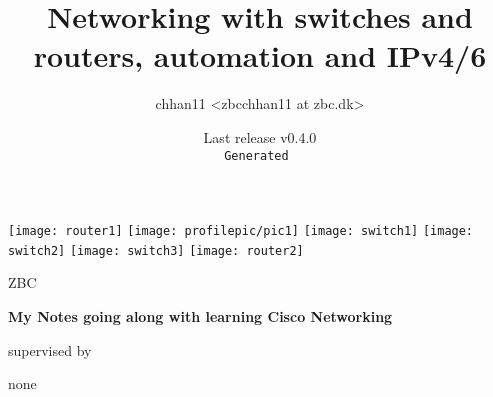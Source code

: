 
\title{Networking with switches and routers, automation and IPv4/6}
\def\thesubject{My Notes going along with learning Cisco Networking}
\def\theinstitution{ZBC}

\author{chhan11 <zbcchhan11 at zbc.dk>}
\def\thesupervisor{none}

\def\theversion{v0.4.0}
\date{{\footnotesize Last release \theversion\\%
    \texttt{\color{Gray}Generated \utccurrenttime}}}

\begin{titlepage}
    \centering
    \texttt{[image: router1]}
    \texttt{[image: profilepic/pic1]}
    \texttt{[image: switch1]}
    \texttt{[image: switch2]}
    \texttt{[image: switch3]}
    \texttt{[image: router2]}\par\vspace{1cm}
    {\scshape\LARGE \theinstitution\par}
    \vspace{1cm}
    {\scshape\Large \thetitle\par}
    \vspace{1.5cm}
    {\huge\bfseries \thesubject\par}
    \vspace{2cm}
    {\Large\itshape \theauthor\par}
    \vfill
    supervised by\par
    \thesupervisor
    
    \vfill
    
    {\large \thedate\par}
\end{titlepage}
